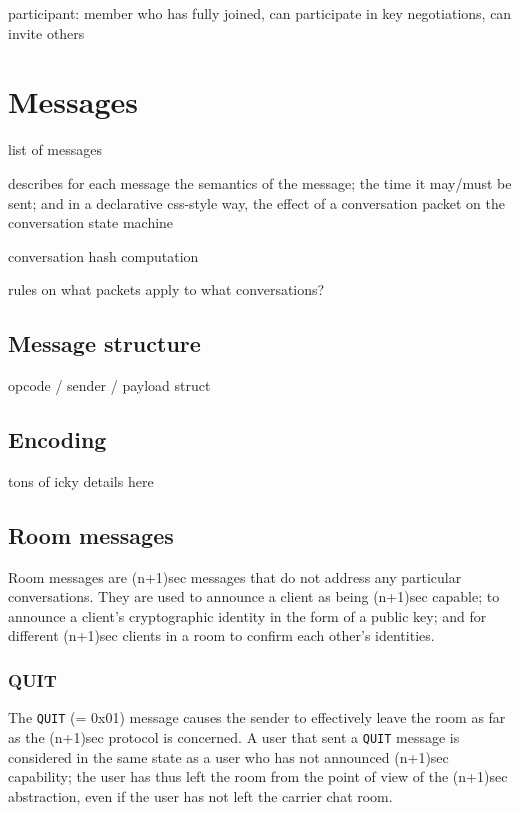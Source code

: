 \documentclass{article}
\def\message#1{\texttt{#1}}
\begin{document}
participant: member who has fully joined, can participate in key negotiations, can invite others



\section{Messages}
list of messages

describes for each message the semantics of the message; the time it may/must be sent; and in a declarative css-style way, the effect of a conversation packet on the conversation state machine

conversation hash computation

rules on what packets apply to what conversations?

\subsection{Message structure}

opcode / sender / payload struct

\subsection{Encoding}

tons of icky details here

\subsection{Room messages}

Room messages are (n+1)sec messages that do not address any particular conversations.
They are used to announce a client as being (n+1)sec capable; to announce a client's cryptographic identity in the form of a public key; and for different (n+1)sec clients in a room to confirm each other's identities.

\subsubsection{QUIT}
\label{sec:messages/quit}

The \message{QUIT} (= 0x01) message causes the sender to effectively leave the room as far as the (n+1)sec protocol is concerned.
A user that sent a \message{QUIT} message is considered in the same state as a user who has not announced (n+1)sec capability; the user has thus left the room from the point of view of the (n+1)sec abstraction, even if the user has not left the carrier chat room.
\end{document}
